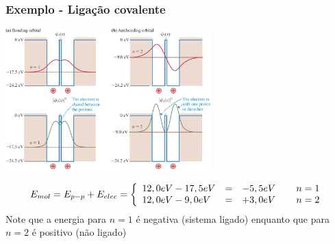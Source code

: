 \documentclass[12pt,brazil,table]{beamer}
\begin{document}
\begin{frame}
  \frametitle{Exemplo - Ligação covalente\\}
  
  \fontsize{9pt}{11pt}\selectfont
  
   \begin{center}
     \vspace*{-1cm}\includegraphics[height=5.5cm]{figuras/fig31}\vspace*{-0.5cm}
   \end{center}
   
    \[
     E_{mol} = E_{p-p}+E_{elec}= \left\{\begin{array}[0.8]{lcrcr}
                                   12,0 eV - 17,5eV &=& -5,5eV & \, &n=1\\ 
                                   12,0 eV - 9,0eV &=& +3,0eV & \, &n=2
                                 \end{array}\right.
    \]
  Note que a energia para $n=1$ é negativa (sistema ligado) enquanto que para $n=2$ é positivo (não ligado)
   

\end{frame}


  
\end{document}
